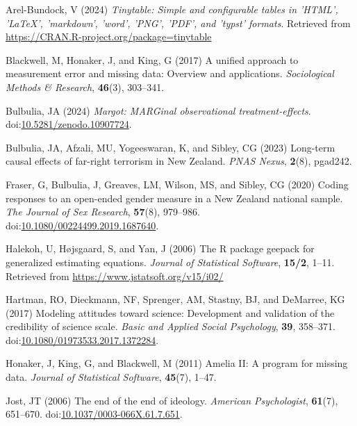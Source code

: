 \documentclass[
  single column]{article}
\newlength{\cslhangindent}
\newenvironment{CSLReferences}[2] %
 {\begin{list}{}{%
  \setlength{\itemindent}{0pt}
  \setlength{\leftmargin}{0pt}
  \setlength{\parsep}{0pt}
  \ifodd #1
   \setlength{\leftmargin}{\cslhangindent}
   \setlength{\itemindent}{-1\cslhangindent}
  \fi
  \setlength{\itemsep}{#2\baselineskip}}}
 {\end{list}}
\begin{document}
\label{refs}
\begin{CSLReferences}{1}{0}
Arel-Bundock, V (2024) \emph{Tinytable: Simple and configurable tables
in 'HTML', 'LaTeX', 'markdown', 'word', 'PNG', 'PDF', and 'typst'
formats}. Retrieved from
\url{https://CRAN.R-project.org/package=tinytable}

Blackwell, M, Honaker, J, and King, G (2017) A unified approach to
measurement error and missing data: Overview and applications.
\emph{Sociological Methods \& Research}, \textbf{46}(3), 303--341.

Bulbulia, JA (2024) \emph{Margot: MARGinal observational
treatment-effects}.
doi:\href{https://doi.org/10.5281/zenodo.10907724}{10.5281/zenodo.10907724}.

Bulbulia, JA, Afzali, MU, Yogeeswaran, K, and Sibley, CG (2023)
Long-term causal effects of far-right terrorism in {N}ew {Z}ealand.
\emph{PNAS Nexus}, \textbf{2}(8), pgad242.

Fraser, G, Bulbulia, J, Greaves, LM, Wilson, MS, and Sibley, CG (2020)
Coding responses to an open-ended gender measure in a {N}ew {Z}ealand
national sample. \emph{The Journal of Sex Research}, \textbf{57}(8),
979--986.
doi:\href{https://doi.org/10.1080/00224499.2019.1687640}{10.1080/00224499.2019.1687640}.

Halekoh, U, Højsgaard, S, and Yan, J (2006) The {R} package geepack for
generalized estimating equations. \emph{Journal of Statistical
Software}, \textbf{15/2}, 1--11. Retrieved from
\url{https://www.jstatsoft.org/v15/i02/}

Hartman, RO, Dieckmann, NF, Sprenger, AM, Stastny, BJ, and DeMarree, KG
(2017) Modeling attitudes toward science: Development and validation of
the credibility of science scale. \emph{Basic and Applied Social
Psychology}, \textbf{39}, 358--371.
doi:\href{https://doi.org/10.1080/01973533.2017.1372284}{10.1080/01973533.2017.1372284}.

Honaker, J, King, G, and Blackwell, M (2011) {Amelia II}: A program for
missing data. \emph{Journal of Statistical Software}, \textbf{45}(7),
1--47.

Jost, JT (2006) The end of the end of ideology. \emph{American
Psychologist}, \textbf{61}(7), 651--670.
doi:\href{https://doi.org/10.1037/0003-066X.61.7.651}{10.1037/0003-066X.61.7.651}.


\end{CSLReferences}
\end{document}
